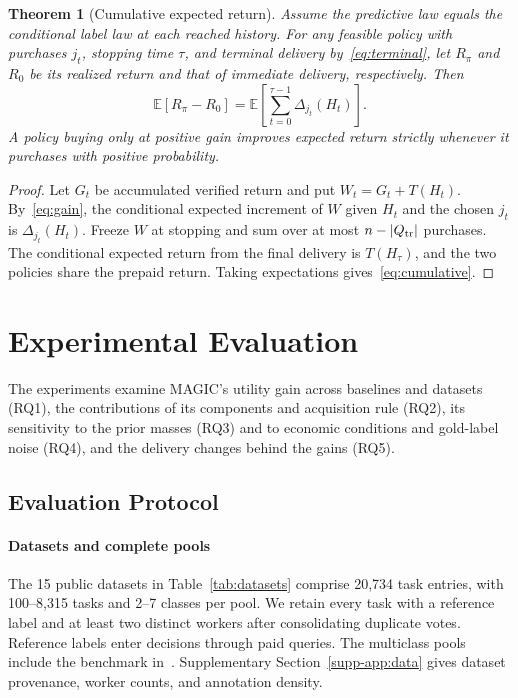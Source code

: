 \documentclass[journal]{IEEEtran}
\newcommand{\E}{\mathbb{E}}
\newtheorem{theorem}{Theorem}
\begin{document}
\begin{theorem}[Cumulative expected return]\label{thm:return}
Assume the predictive law equals the conditional label law at each reached history. For any feasible policy with purchases $j_t$, stopping time $\tau$, and terminal delivery by~\eqref{eq:terminal}, let $R_\pi$ and $R_0$ be its realized return and that of immediate delivery, respectively. Then
\begin{equation}
 \E[R_\pi-R_0]=\E\!\left[\sum_{t=0}^{\tau-1}\Delta_{j_t}(H_t)\right].\label{eq:cumulative}
\end{equation}
A policy buying only at positive gain improves expected return strictly whenever it purchases with positive probability.
\end{theorem}
\begin{proof}
Let $G_t$ be accumulated verified return and put $W_t=G_t+T(H_t)$. By~\eqref{eq:gain}, the conditional expected increment of $W$ given $H_t$ and the chosen $j_t$ is $\Delta_{j_t}(H_t)$. Freeze $W$ at stopping and sum over at most $n-|Q_{\rm tr}|$ purchases. The conditional expected return from the final delivery is $T(H_\tau)$, and the two policies share the prepaid return. Taking expectations gives~\eqref{eq:cumulative}.
\end{proof}


\section{Experimental Evaluation}
\label{sec:experiments}
The experiments examine MAGIC's utility gain across baselines and datasets (RQ1), the contributions of its components and acquisition rule (RQ2), its sensitivity to the prior masses (RQ3) and to economic conditions and gold-label noise (RQ4), and the delivery changes behind the gains (RQ5).

\subsection{Evaluation Protocol}
\label{sec:protocol}
\paragraph{Datasets and complete pools}
The 15 public datasets in Table~\ref{tab:datasets} comprise 20,734 task entries, with 100--8,315 tasks and 2--7 classes per pool. We retain every task with a reference label and at least two distinct workers after consolidating duplicate votes. Reference labels enter decisions through paid queries. The multiclass pools include the benchmark in~\cite{zhang2016multiclass}. Supplementary Section~\ref{supp-app:data} gives dataset provenance, worker counts, and annotation density.
\end{document}

